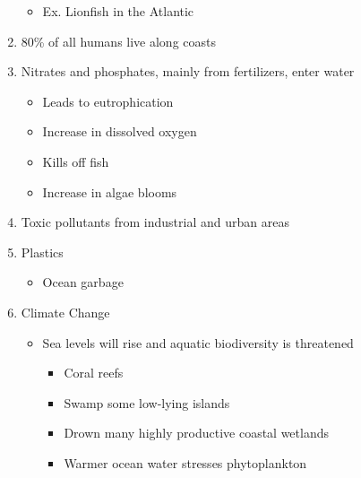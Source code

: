 \documentclass[12pt]{article}
\begin{document}
\begin{enumerate}
\begin{itemize}
      \item Ex. Lionfish in the Atlantic

    \end{itemize}

  \item 80\% of all humans live along coasts

  \item Nitrates and phosphates, mainly from fertilizers, enter water

    \begin{itemize}

      \item Leads to eutrophication

      \item Increase in dissolved oxygen

      \item Kills off fish

      \item Increase in algae blooms

    \end{itemize}

  \item Toxic pollutants from industrial and urban areas

  \item Plastics

    \begin{itemize}

      \item Ocean garbage

    \end{itemize}

  \item Climate Change

    \begin{itemize}

      \item Sea levels will rise and aquatic biodiversity is threatened

        \begin{itemize}

          \item Coral reefs

          \item Swamp some low-lying islands

          \item Drown many highly productive coastal wetlands

          \item Warmer ocean water stresses phytoplankton


\end{itemize}
\end{itemize}
\end{enumerate}
\end{document}
